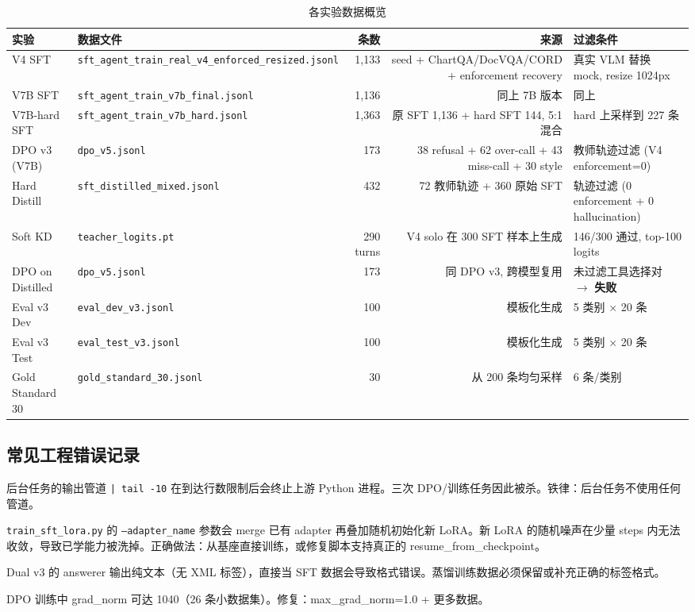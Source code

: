 \documentclass[12pt,a4paper]{ctexart}
\begin{document}
\begin{table}[H]
\centering
\small
\caption{各实验数据概览}
\label{tab:data_overview}
\begin{tabular}{llrrp{4cm}}
\toprule
实验 & 数据文件 & 条数 & 来源 & 过滤条件 \\
\midrule
V4 SFT & \texttt{sft\_agent\_train\_real\_v4\_enforced\_resized.jsonl} & 1,133 & seed + ChartQA/DocVQA/CORD + enforcement recovery & 真实 VLM 替换 mock, resize 1024px \\
V7B SFT & \texttt{sft\_agent\_train\_v7b\_final.jsonl} & 1,136 & 同上 7B 版本 & 同上 \\
V7B-hard SFT & \texttt{sft\_agent\_train\_v7b\_hard.jsonl} & 1,363 & 原 SFT 1,136 + hard SFT 144, 5:1 混合 & hard 上采样到 227 条 \\
\midrule
DPO v3 (V7B) & \texttt{dpo\_v5.jsonl} & 173 & 38 refusal + 62 over-call + 43 miss-call + 30 style & 教师轨迹过滤 (V4 enforcement=0) \\
Hard Distill & \texttt{sft\_distilled\_mixed.jsonl} & 432 & 72 教师轨迹 + 360 原始 SFT & 轨迹过滤 (0 enforcement + 0 hallucination) \\
Soft KD & \texttt{teacher\_logits.pt} & 290 turns & V4 solo 在 300 SFT 样本上生成 & 146/300 通过, top-100 logits \\
DPO on Distilled & \texttt{dpo\_v5.jsonl} & 173 & 同 DPO v3, 跨模型复用 & 未过滤工具选择对 $\rightarrow$ \textbf{失败} \\
\midrule
Eval v3 Dev & \texttt{eval\_dev\_v3.jsonl} & 100 & 模板化生成 & 5 类别 × 20 条 \\
Eval v3 Test & \texttt{eval\_test\_v3.jsonl} & 100 & 模板化生成 & 5 类别 × 20 条 \\
Gold Standard 30 & \texttt{gold\_standard\_30.jsonl} & 30 & 从 200 条均匀采样 & 6 条/类别 \\
\bottomrule
\end{tabular}
\end{table}

\subsection{常见工程错误记录}

\begin{description}[nosep]
  \item[\texttt{| tail/head -N} 杀死后台进程] 后台任务的输出管道 \texttt{| tail -10} 在到达行数限制后会终止上游 Python 进程。三次 DPO/训练任务因此被杀。铁律：后台任务不使用任何管道。
  \item[Merge + Fresh LoRA] \texttt{train\_sft\_lora.py} 的 \texttt{--adapter\_name} 参数会 merge 已有 adapter 再叠加随机初始化新 LoRA。新 LoRA 的随机噪声在少量 steps 内无法收敛，导致已学能力被洗掉。正确做法：从基座直接训练，或修复脚本支持真正的 resume\_from\_checkpoint。
  \item[软标签格式缺失] Dual v3 的 answerer 输出纯文本（无 XML 标签），直接当 SFT 数据会导致格式错误。蒸馏训练数据必须保留或补充正确的标签格式。
  \item[Gradient Explosion] DPO 训练中 grad\_norm 可达 1040（26 条小数据集）。修复：max\_grad\_norm=1.0 + 更多数据。
\end{description}
\end{document}
